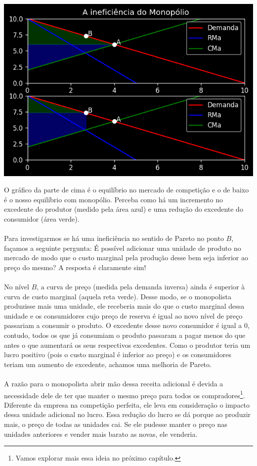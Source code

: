 \documentclass[a4paper,11pt,oneside]{book}
\theoremstyle{definition}
\theoremstyle{break}
\begin{document}
\begin{center}
\includegraphics[scale=0.8]{cap25_4-inef_monopolio.png}
\end{center}

O gráfico da parte de cima é o equilíbrio no mercado de competição e o de baixo é o nosso equilíbrio com monopólio. Perceba como há um incremento no excedente do produtor (medido pela área azul) e uma redução do excedente do consumidor (área verde).
\\~\\
Para investigarmos se há uma ineficiência no sentido de Pareto no ponto $B$, façamos a seguinte pergunta: É possível adicionar uma unidade de produto no mercado de modo que o custo marginal pela produção desse bem seja inferior ao preço do mesmo? A resposta é claramente sim!
\\~\\
No nível $B$, a curva de preço (medida pela demanda inversa) ainda é superior à curva de custo marginal (aquela reta verde). Desse modo, se o monopolista produzisse mais uma unidade, ele receberia mais do que o custo marginal dessa unidade e os consumidores cujo preço de reserva é igual ao novo nível de preço passariam a consumir o produto. O excedente desse novo consumidor é igual a $0$, contudo, todos os que já consumiam o produto passaram a pagar menos do que antes o que aumentará os seus respectivos excedentes. Como o produtor teria um lucro positivo (pois o custo marginal é inferior ao preço) e os consumidores teriam um aumento de excedente, achamos uma melhoria de Pareto.
\\~\\
A razão para o monopolista abrir mão dessa receita adicional é devida a necessidade dele de ter que manter o mesmo preço para todos os compradores\footnote{Vamos explorar mais essa ideia no próximo capítulo.}. Diferente da empresa na competição perfeita, ele leva em consideração o impacto dessa unidade adicional no lucro. Essa redução do lucro se dá porque ao produzir mais, o preço de todas as unidades cai. Se ele pudesse manter o preço nas unidades anteriores e vender mais barato as novas, ele venderia. 
\end{document}

